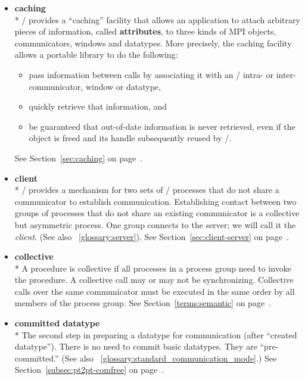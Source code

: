 \begin{itemize}
\label{glossary:caching}
\item \textbf{ caching} \\*
\MPI/ provides a ``caching'' facility that allows an application to
attach arbitrary pieces of information, called {\bf attributes}, to
three kinds of MPI objects, communicators, windows and datatypes.
More precisely, the caching
facility allows a portable library to do the following:
\begin{itemize}
\item
  pass information between calls by associating it
  with an \MPI/ intra- or in\-ter-\-com\-mun\-i\-ca\-tor, 
window or datatype,
\item quickly retrieve that information, and
\item
 be guaranteed that out-of-date information is never retrieved, even if
 the object is freed and its handle subsequently reused by \MPI/.
\end{itemize}
See Section~\ref{sec:caching} on page~\pageref{sec:caching}.

\label{glossary:client}
\item \textbf{ client} \\*
 \MPI/ provides a mechanism for two sets of \MPI/  processes that do not share a communicator
to establish communication.
Establishing contact between two groups of processes that do not share an
existing communicator is a collective but asymmetric process.  One group connects to the
server; we will call it the \emph{client}. 
(See also ~\ref{glossary:server}). 
See Section~\ref{sec:client-server} on page~\pageref{sec:client-server}.

\label{glossary:collective}
\item \textbf{ collective} \\*
A procedure is collective if all processes in a process group need to invoke the procedure.  A
collective call may or may not be synchronizing.
Collective calls over the same communicator
must be executed in the same order by all members of the process
group.
See Section~\ref{terms:semantic} on page~\pageref{terms:semantic}.

\label{glossary:committed_datatype}
\item \textbf{ committed datatype} \\*
The second step in preparing a datatype for communication (after ``created datatype'').
There is no need to commit basic datatypes. They are ``pre-committed.''
(See also ~\ref{glossary:standard_communication_mode}.)
See Section~\ref{subsec:pt2pt-comfree} on page~\pageref{subsec:pt2pt-comfree}.


\end{itemize}
